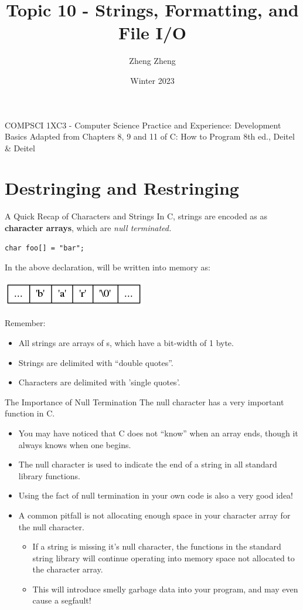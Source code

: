 \documentclass[11pt]{beamer}
\author{Zheng Zheng}
\title{Topic 10 - Strings, Formatting, and File I/O}
\institute{McMaster University}
\date{Winter 2023}
\let\OldTexttt\texttt
\renewcommand{\texttt}[1]{\OldTexttt{\color{teal}{#1}}}
\begin{document}
\begin{frame}
\center
COMPSCI 1XC3 - Computer Science Practice and Experience: 
Development Basics
\titlepage
Adapted from Chapters 8, 9 and 11 of C: How to Program 8th ed., Deitel \& Deitel
\end{frame}

\begin{frame}
\tableofcontents
\end{frame}

\section[Conversions]{Destringing and Restringing}
\begin{frame}[fragile=singleslide]{A Quick Recap of Characters and Strings}
In C, strings are encoded as as \textbf{character arrays}, which are \emph{null terminated.} 
\begin{lstlisting}[style=C]
char foo[] = "bar";
\end{lstlisting}
In the above declaration, \texttt{foo} will be written into memory as:
\begin{center}
\includegraphics[scale=0.5]{string.png}
\end{center}
Remember:
\begin{itemize}
\item All strings are arrays of \texttt{char}s, which have a bit-width of 1 byte.  
\item Strings are delimited with ``double quotes''.
\item Characters are delimited with 'single quotes'.
\end{itemize}
\end{frame}

\begin{frame}{The Importance of Null Termination}
The null character has a very important function in C.
\begin{itemize}
\item You may have noticed that C does not ``know'' when an array ends, though it always knows when one begins.  
\item The null character \texttt{\textbackslash 0} is used to indicate the end of a string in all standard library functions.
\item Using the fact of null termination in your own code is also a very good idea! 
\item A common pitfall is not allocating enough space in your character array for the null character.  
\begin{itemize}
\item If a string is missing it's null character, the functions in the standard string library will continue operating into memory space not allocated to the character array.
\item This will introduce smelly garbage data into your program, and may even cause a segfault! 
\end{itemize}
\end{itemize}
\end{frame}
\end{document}
